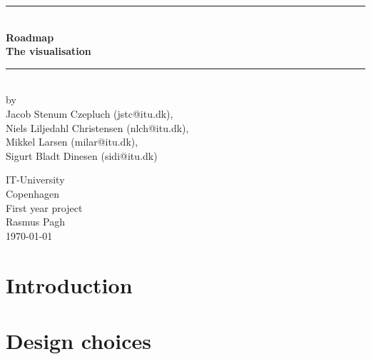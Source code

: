 \documentclass[a4paper,11pt]{article}
\begin{document}
\begin{titlepage}
\centering \parindent=0pt
\newcommand{\HRule}{\rule{\textwidth}{1mm}}
 \HRule\\[1cm]\Huge\bfseries
Roadmap\\[0.7cm]
\large The visualisation\\[1cm]
\HRule\\[4cm]  \large by \\Jacob Stenum Czepluch (jstc@itu.dk), \\Niels Liljedahl Christensen (nlch@itu.dk), \\Mikkel Larsen (milar@itu.dk), \\Sigurt Bladt Dinesen (sidi@itu.dk) \\
 \normalsize %
\begin{flushleft}
IT-University\\
Copenhagen\\
First year project\\
Rasmus Pagh\\
\today \end{flushleft}
\end{titlepage}

\tableofcontents
\pagebreak

\pagebreak
\section{Introduction}


\pagebreak
\section{Design choices}
\label{sec:Design choices}
\end{document}
